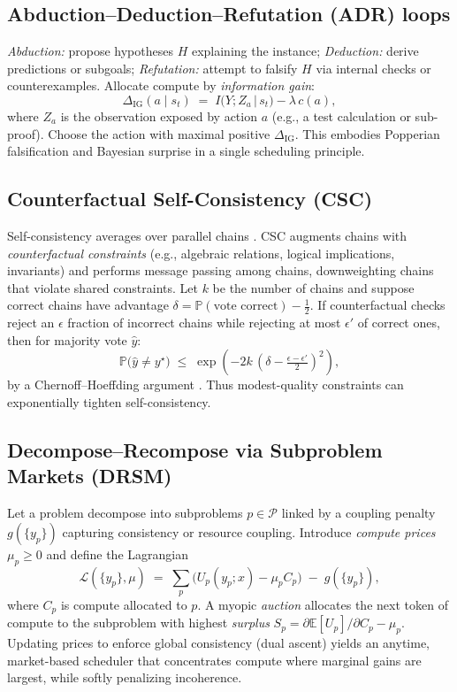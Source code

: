 \documentclass[11pt]{article}
\newcommand{\E}{\mathbb{E}}
\newcommand{\Prob}{\mathbb{P}}
\newcommand{\1}{\mathbb{I}}
\begin{document}
\subsection{Abduction--Deduction--Refutation (ADR) loops}

\emph{Abduction:} propose hypotheses $H$ explaining the instance; 
\emph{Deduction:} derive predictions or subgoals; 
\emph{Refutation:} attempt to falsify $H$ via internal checks or counterexamples.
Allocate compute by \emph{information gain}:
\begin{equation}
\Delta_{\mathrm{IG}}(a \mid s_t) \;=\; I\big(Y; Z_a \,\big|\, s_t \big) - \lambda\, c(a),
\end{equation}
where $Z_a$ is the observation exposed by action $a$ (e.g., a test calculation or sub-proof). Choose the action with maximal positive $\Delta_{\mathrm{IG}}$. This embodies Popperian falsification and Bayesian surprise in a single scheduling principle.

\subsection{Counterfactual Self-Consistency (CSC)}

Self-consistency averages over parallel chains \cite{wang2023selfconsistency}. CSC augments chains with \emph{counterfactual constraints} (e.g., algebraic relations, logical implications, invariants) and performs message passing among chains, downweighting chains that violate shared constraints.
Let $k$ be the number of chains and suppose correct chains have advantage $\delta = \Prob(\text{vote correct}) - \tfrac{1}{2}$. 
If counterfactual checks reject an $\epsilon$ fraction of incorrect chains while rejecting at most $\epsilon'$ of correct ones, then for majority vote $\hat{y}$:
\begin{equation}
\Prob\big(\hat{y} \neq y^\star\big) 
\;\le\; 
\exp\!\left(-2 k\,(\delta - \tfrac{\epsilon-\epsilon'}{2})^2\right),
\label{eq:csc-bound}
\end{equation}
by a Chernoff--Hoeffding argument \cite{hoeffding1963}. Thus modest-quality constraints can exponentially tighten self-consistency.

\subsection{Decompose--Recompose via Subproblem Markets (DRSM)}

Let a problem decompose into subproblems $p \in \mathcal{P}$ linked by a coupling penalty $g(\{y_p\})$ capturing consistency or resource coupling. 
Introduce \emph{compute prices} $\mu_p \ge 0$ and define the Lagrangian
\begin{equation}
\mathcal{L}(\{y_p\}, \mu) \;=\; \sum_{p} \big( U_p(y_p;x) - \mu_p C_p \big) \;-\; g(\{y_p\}),
\end{equation}
where $C_p$ is compute allocated to $p$.
A myopic \emph{auction} allocates the next token of compute to the subproblem with highest \emph{surplus} 
$S_p = \partial \E[U_p]/\partial C_p - \mu_p$.
Updating prices to enforce global consistency (dual ascent) yields an anytime, market-based scheduler that concentrates compute where marginal gains are largest, while softly penalizing incoherence.
\end{document}
